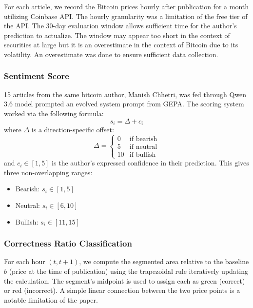 \documentclass[sigconf,screen]{acmart}
\begin{document}
For each article, we record the Bitcoin prices hourly after publication for a month utilizing Coinbase API. The hourly granularity was a limitation of the free tier of the API. The 30-day evaluation window allows sufficient time for the author's prediction to actualize. The window may appear too short in the context of securities at large but it is an overestimate in the context of Bitcoin due to its volatility. An overestimate was done to ensure sufficient data collection.

\subsubsection{Sentiment Score}

15 articles from the same bitcoin author, Manish Chhetri, was fed through Qwen 3.6 model prompted an evolved system prompt from GEPA. The scoring system worked via the following formula:
\begin{equation}
s_i = \Delta + c_i
\end{equation}
where $\Delta$ is a direction-specific offset:
\begin{equation}
\Delta =
\begin{cases}
0 & \text{if bearish} \\
5 & \text{if neutral} \\
10 & \text{if bullish}
\end{cases}
\end{equation}
and $c_i \in [1, 5]$ is the author's expressed confidence in their prediction. This gives three non-overlapping ranges:
\begin{itemize}
    \item Bearish: $s_i \in [1, 5]$
    \item Neutral: $s_i \in [6, 10]$
    \item Bullish: $s_i \in [11, 15]$
\end{itemize}

\subsubsection{Correctness Ratio Classification}

For each hour $(t, t+1)$, we compute the segmented area relative to the baseline $b$ (price at the time of publication) using the trapezoidal rule iteratively updating the calculation. The segment's midpoint is used to assign each as green (correct) or red (incorrect). A simple linear connection between the two price points is a notable limitation of the paper.
\end{document}
